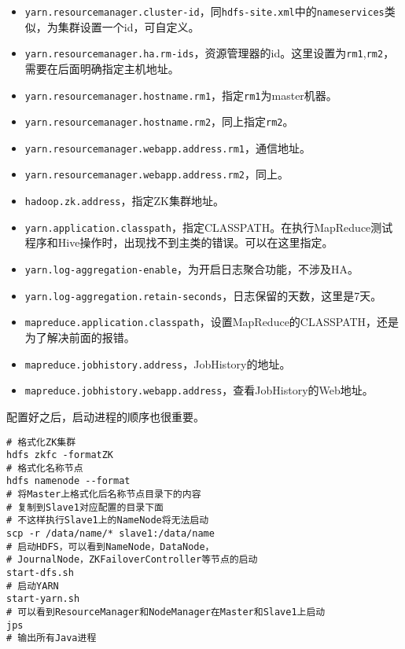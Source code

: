 \begin{itemize}
	\item \lstinline{yarn.resourcemanager.cluster-id}，同\lstinline{hdfs-site.xml}中的\lstinline{nameservices}类似，为集群设置一个id，可自定义。
	\item \lstinline{yarn.resourcemanager.ha.rm-ids}，资源管理器的id。这里设置为\lstinline{rm1},\lstinline{rm2}，需要在后面明确指定主机地址。
	\item \lstinline{yarn.resourcemanager.hostname.rm1}，指定\lstinline{rm1}为master机器。
	\item \lstinline{yarn.resourcemanager.hostname.rm2}，同上指定\lstinline{rm2}。
	\item \lstinline{yarn.resourcemanager.webapp.address.rm1}，通信地址。
	\item \lstinline{yarn.resourcemanager.webapp.address.rm2}，同上。
	\item \lstinline{hadoop.zk.address}，指定ZK集群地址。
	\item \lstinline{yarn.application.classpath}，指定CLASSPATH。在执行MapReduce测试程序和Hive操作时，出现找不到主类的错误。可以在这里指定。
	\item \lstinline{yarn.log-aggregation-enable}，为开启日志聚合功能，不涉及HA。
	\item \lstinline{yarn.log-aggregation.retain-seconds}，日志保留的天数，这里是7天。
\end{itemize}

\begin{itemize}
	\item \lstinline{mapreduce.application.classpath}，设置MapReduce的CLASSPATH，还是为了解决前面的报错。
	\item \lstinline{mapreduce.jobhistory.address}，JobHistory的地址。
	\item \lstinline{mapreduce.jobhistory.webapp.address}，查看JobHistory的Web地址。
\end{itemize}

配置好之后，启动进程的顺序也很重要。
\begin{lstlisting}[style=mysh, title=启动步骤]
# 格式化ZK集群
hdfs zkfc -formatZK
# 格式化名称节点
hdfs namenode --format
# 将Master上格式化后名称节点目录下的内容
# 复制到Slave1对应配置的目录下面
# 不这样执行Slave1上的NameNode将无法启动
scp -r /data/name/* slave1:/data/name
# 启动HDFS，可以看到NameNode，DataNode，
# JournalNode，ZKFailoverController等节点的启动
start-dfs.sh
# 启动YARN
start-yarn.sh
# 可以看到ResourceManager和NodeManager在Master和Slave1上启动
jps
# 输出所有Java进程
\end{lstlisting}

